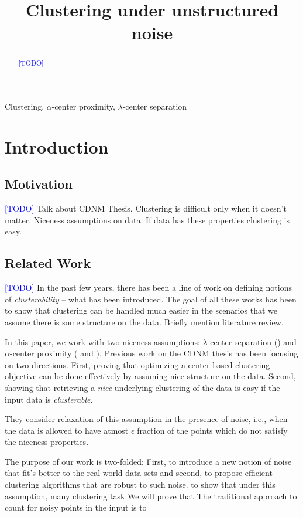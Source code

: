 \documentclass[anon,12pt]{colt2016} %
\title[Sparse Noise]{Clustering under unstructured noise}
\newcommand{\todo}{\textcolor{blue}{[TODO]}\xspace}
\begin{document}
\maketitle

\begin{abstract}
\todo
\end{abstract}

\begin{keywords}
Clustering, $\alpha$-center proximity, $\lambda$-center separation
\end{keywords}

\section{Introduction}
\subsection{Motivation}
\todo Talk about CDNM Thesis. Clustering is difficult only when it doesn't matter. Niceness assumptions on data. If data has these properties clustering is easy.

\subsection{Related Work}
\todo In the past few years, there has been a line of work on defining notions of {\em clusterability} -- what  has been introduced. The goal of all these works has been to show that clustering can be handled much easier in the scenarios that we assume there is some structure on the data. Briefly mention literature review.

In this paper, we work with two niceness assumptions:  $\lambda$-center separation (\cite{ben2014clustering}) and $\alpha$-center proximity (\cite{awasthi2012center} and \cite{balcan2012clustering}). Previous work on the CDNM thesis has been focusing on two directions. First, proving that optimizing a center-based clustering objective can be done effectively by assuming nice structure on the data. Second, showing that retrieving a {\em nice} underlying clustering of the data is easy if the input data is {\em clusterable}.

 They consider relaxation of this assumption in the presence of noise, i.e., when the data is allowed to have atmost $\epsilon$ fraction of the points which do not satisfy the niceness properties.

The purpose of our work is two-folded: First, to introduce a new notion of noise that fit's better to the real world data sets and second, to propose efficient clustering algorithms that are robust to such noise. to show that under this assumption, many clustering task   We will prove that  The traditional approach to count for noisy points in the input is to 
\end{document}
